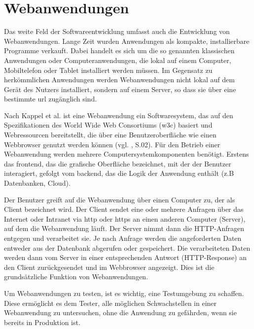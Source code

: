 \section{Webanwendungen}

Das weite Feld der Softwareentwicklung umfasst auch die
Entwicklung von Webanwendungen. Lange Zeit wurden
Anwendungen als kompakte, installierbare Programme
verkauft. Dabei handelt es sich um die so genannten
klassischen Anwendungen oder Computeranwendungen, die
lokal auf einem Computer, Mobiltelefon oder Tablet
installiert werden müssen. Im Gegensatz zu herkömmlichen
Anwendungen werden Webanwendungen nicht lokal auf dem Gerät
des Nutzers installiert, sondern auf einem Server, so dass
sie über eine bestimmte \acs{url} zugänglich sind.

Nach Kappel et al. ist eine Webanwendung ein Softwaresystem,
das auf den Spezifikationen des World Wide Web Consortiums
(\acs{w3c}) basiert und Webressourcen bereitstellt, die über
eine Benutzeroberfläche wie einen Webbrowser genutzt werden
können (vgl. \cite{kappel1}, S.02). Für den Betrieb einer Webanwendung werden mehrere
Computersystemkomponenten benötigt. Erstens das \gls{frontend},
das die grafische Oberfläche bezeichnet, mit der der
Benutzer interagiert, gefolgt vom \gls{backend}, das die
Logik der Anwendung enthält (z.B Datenbanken, Cloud).


Der Benutzer greift auf die Webanwendung über einen Computer
zu, der als Client bezeichnet wird. Der Client sendet eine
oder mehrere Anfragen über das Internet oder Intranet via
\acs{http} oder \acs{https}  an einen anderen Computer (Server),
auf dem die Webanwendung läuft. Der Server nimmt dann die
HTTP-Anfragen entgegen und verarbeitet sie. Je nach Anfrage
werden die angeforderten Daten entweder aus der Datenbank
abgerufen oder gespeichert. Die verarbeiteten Daten werden
dann vom Server in einer entsprechenden Antwort
(HTTP-Response) an den Client zurückgesendet und im
Webbrowser angezeigt. Dies ist die grundsätzliche Funktion von Webanwendungen.

Um Webanwendungen zu testen, ist es wichtig, eine Testumgebung zu schaffen.
Diese  ermöglicht es dem Tester, alle möglichen Schwachstellen in einer Webanwendung zu untersuchen,
ohne die Anwendung zu gefährden, wenn sie bereits in Produktion ist.

